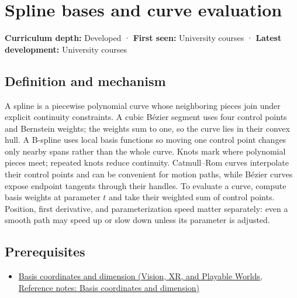 \hypertarget{appendix-f28eeec97a3d}{}\label{referencestart:appendix-f28eeec97a3d}
\section{Spline bases and curve evaluation}\label{appendix-f28eeec97a3d-spline-bases-and-curve-evaluation}

\textbf{Curriculum depth:} Developed · \textbf{First seen:} University courses · \textbf{Latest development:} University courses

\begin{allmightroledefinition}

\subsection{Definition and mechanism}\label{appendix-f28eeec97a3d-definition-and-mechanism}

A spline is a piecewise polynomial curve whose neighboring pieces join under explicit continuity constraints. A cubic Bézier segment uses four control points and Bernstein weights; the weights sum to one, so the curve lies in their convex hull. A B-spline uses local basis functions so moving one control point changes only nearby spans rather than the whole curve. Knots mark where polynomial pieces meet; repeated knots reduce continuity. Catmull--Rom curves interpolate their control points and can be convenient for motion paths, while Bézier curves expose endpoint tangents through their handles. To evaluate a curve, compute basis weights at parameter \(t\) and take their weighted sum of control points. Position, first derivative, and parameterization speed matter separately: even a smooth path may speed up or slow down unless its parameter is adjusted.

\end{allmightroledefinition}

\subsection{Prerequisites}\label{appendix-f28eeec97a3d-prerequisites}

\begin{itemize}
\tightlist
\item
  \href{../07-Vision-XR-and-Playable-Worlds/main.pdf\#nameddest=appendix-ce0341f7ea0d}{Basis coordinates and dimension (Vision, XR, and Playable Worlds, Reference notes: Basis coordinates and dimension)}
\end{itemize}

